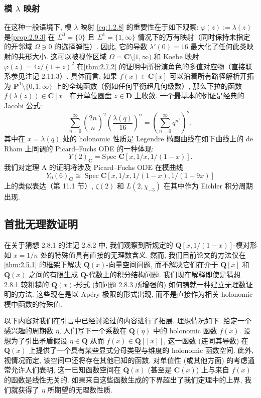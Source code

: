 \subsubsection{模 \(\lambda\) 映射}\label{sec:2.9.5}

在这种一般语境下, 模 \(\lambda\) 映射 \eqref{eq:1.2.8} 的重要性在于如下观察: \(\varphi(z) := \lambda(z)\) 是\autoref{prop:2.9.3} 在 \(\Sigma^0 = \{0\}\) 且 \(\Sigma^1 = \{1, \infty\}\) 情况下的万有映射（同时保持未指定的开邻域 \(\Omega \ni 0\) 的选择弹性）.
因此, 它的导数 \(\lambda'(0) = 16\) 最大化了任何此类映射的共形大小.
这可以被视作区域 \(\Omega = \mathbf{C} \setminus [1, \infty)\) 和 Koebe 映射 \(\varphi(z) = 4z/(1+z)^2\) 在\autoref{thm:2.7.2} 的证明中所扮演角色的多值对应物（直接联系参见注记 2.11.3）.
具体而言, 如果 \(f(x) \in \mathbf{C}[x]\) 可以沿着所有路径解析开拓为 \(\mathbf{P}^1 \setminus \{0, 1, \infty\}\) 上的全纯函数（例如任何平衡超几何级数）, 那么下拉的函数 \(f(\lambda(z)) \in \mathbf{C}[x]\) 在开单位圆盘 \(z \in \mathbf{D}\) 上收敛.
一个最基本的例证是经典的 Jacobi 公式:
\begin{equation}\label{eq:2.9.6}
\sum_{n=0}^{\infty} {2n \choose n}^2 \left(\frac{\lambda(q)}{16}\right)^n = \left(\sum_{n=0}^{\infty} q^{n^2}\right)^2,
\end{equation}
其中在 \(x = \lambda(q)\) 处的 holonomic 性质是 Legendre 椭圆曲线在如下曲线上的 de Rham 上同调的 Picard--Fuchs ODE 的一种体现:
\[ Y(2)_{\mathbf{C}} = \text{Spec } \mathbf{C} [x, 1/x, 1/(1-x)]. \]
我们对定理 A 的证明将涉及 Picard--Fuchs ODE 在模曲线
\[ Y_0(6)_{\mathbf{C}} \cong \operatorname{Spec} \mathbf{C} [x, 1/x, 1/(1-x), 1/(1-9x)] \]
上的类似表达（第 11.1 节）, \(\zeta(2)\) 和 \(L(2,\chi_{-3})\) 在其中作为 Eichler 积分周期出现.

\subsection{首批无理数证明}\label{sec:2.10}

在关于猜想 2.8.1 的注记 2.8.2 中, 我们观察到所规定的 \(\mathbf{Q}[x,1/(1-x)]\)-模对形如 $x=1/n$ 处的特殊值具有直接的无理数含义. 然而, 我们目前论文的方法仅在\autoref{thm:2.5.1} 的框架下解决 \(\mathbf{Q}(x)\)-向量空间问题, 而不解决它们在介于 \(\mathbf{Q}[x]\) 和 \(\mathbf{Q}(x)\) 之间的有限生成 \(\mathbf{Q}\)-代数上的积分结构问题. 我们现在解释即使是猜想 2.8.1 较粗糙的 \(\mathbf{Q}(x)\)-形式 (如问题 2.8.3 所增强的) 如何铸就一种建立无理数证明的方法. 这些现在是以 Ap{\'e}ry 极限的形式出现, 而不是直接作为相关 holonomic 模中函数的特殊值.

以下内容对我们在引言中已经讨论过的内容进行了拓展. 理想情况如下. 给定一个感兴趣的周期数 \(\eta\), 人们写下一个系数在 \(\mathbf{Q}(\eta)\) 中的 holonomic 函数 $f(x)$. 设想为了引出矛盾假设 \(\eta \in \mathbf{Q}\) 从而 \(f(x) \in \mathbf{Q}[\![x]\!]\), 这一函数 (连同其导数) 在 \(\mathbf{Q}(x)\) 上提供了一个具有某些显式分母类型与维度的 holonomic 函数空间. 此外, 视情况而定, 该空间中还将存在其他已知的函数. 对单值性 (或其他方面) 的考虑通常允许人们表明, 这一已知函数空间在 \(\mathbf{Q}(x)\) (甚至是 \(\mathbf{C}(x)\)) 上与来自 \(f(x)\) 的函数是线性无关的. 如果来自这些函数生成的下界超出了我们定理中的上界, 我们就获得了 \(\eta\) 所期望的无理数性质.

